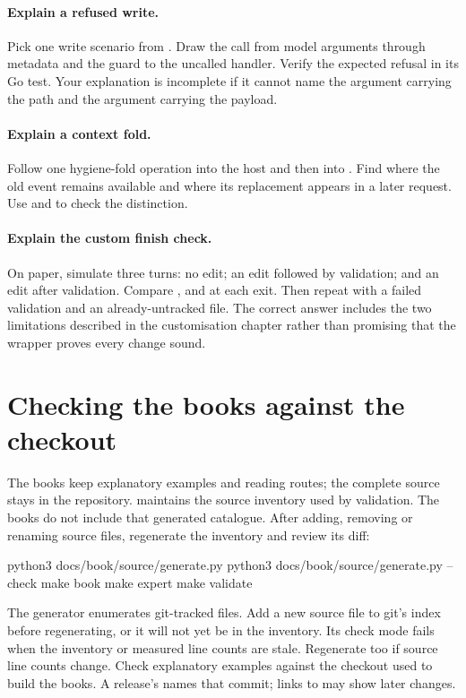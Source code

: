 \paragraph{Explain a refused write.} Pick one write scenario from
. Draw the call from model arguments through metadata and the
guard to the uncalled handler. Verify the expected refusal in its Go test.
Your explanation is incomplete if it cannot name the argument carrying
the path and the argument carrying the payload.

\paragraph{Explain a context fold.} Follow one hygiene-fold operation
into the host and then into . Find where the old event
remains available and where its replacement appears in a later request.
Use  and
 to check the distinction.

\paragraph{Explain the custom finish check.} On paper, simulate three
turns: no edit; an edit followed by validation; and an edit after validation.
Compare ,  and  at each exit.
Then repeat with a failed validation and an already-untracked file. The
correct answer includes the two limitations described in the customisation
chapter rather than promising that the wrapper proves every change sound.

\section{Checking the books against the checkout}

The books keep explanatory examples and reading routes; the complete source
stays in the repository.  maintains the
source inventory used by validation. The books do not include that generated
catalogue. After adding, removing or renaming source files, regenerate the
inventory and review its diff:
\begin{sh}
python3 docs/book/source/generate.py
python3 docs/book/source/generate.py --check
make book
make expert
make validate
\end{sh}

The generator enumerates git-tracked files. Add a new source file to git's
index before regenerating, or it will not yet be in the inventory. Its
check mode fails when the inventory or measured line counts are stale.
Regenerate too if source line counts change. Check explanatory examples
against the checkout used to build the books. A release's 
names that commit; links to  may show later changes.

